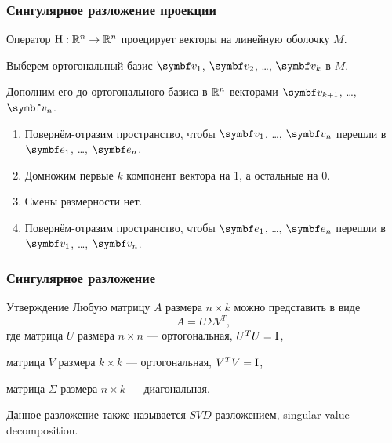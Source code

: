 \begin{frame}
  \frametitle{Сингулярное разложение проекции}

  Оператор $\mathrm{H}: \mathbb{R}^n \to \mathbb{R}^n$ проецирует векторы на линейную оболочку $M$. \pause

  Выберем ортогональный базис $\bv_1$, $\bv_2$, \ldots, $\bv_k$ в $M$. \pause

  Дополним его до ортогонального базиса в $\mathbb{R}^n$ векторами $\bv_{k+1}$, \ldots, $\bv_n$. \pause


  \begin{enumerate}
    \item Повернём-отразим пространство, чтобы $\bv_1$, \ldots, $\bv_n$ перешли в $\be_1$, \ldots, $\be_n$. \pause
    \item Домножим первые $k$ компонент вектора на 1, а остальные на 0.  \pause
    \item Смены размерности нет. \pause
   \item Повернём-отразим пространство, чтобы $\be_1$, \ldots, $\be_n$ перешли в $\bv_1$, \ldots, $\bv_n$. 
  \end{enumerate}  

\end{frame}



\begin{frame}
  \frametitle{Сингулярное разложение}

  \begin{block}{Утверждение}
    Любую матрицу $A$ размера $n\times k$ можно представить в виде
    \[
    A = U \Sigma V^T,  
    \]
    где матрица $U$ размера $n\times n$ — ортогональная, $U^TU=\mathrm{I}$,

    матрица $V$ размера $k\times k$ — ортогональная, $V^TV=\mathrm{I}$,

    матрица $\Sigma$ размера $n\times k$ — диагональная.
    
  \end{block} \pause

  Данное разложение также называется \alert{$SVD$-разложением}, singular value decomposition.

\end{frame}
  



